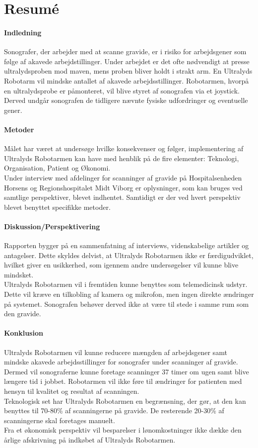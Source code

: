 \chapter{Resumé}
\subsubsection{Indledning}  
Sonografer, der arbejder med at scanne gravide, er i risiko for arbejdsgener som følge af akavede arbejdstillinger. Under arbejdet er det ofte nødvendigt at presse ultralydsproben mod maven, mens proben bliver holdt i strakt arm. En Ultralyds Robotarm vil mindske antallet af akavede arbejdsstillinger. Robotarmen, hvorpå en ultralydsprobe er påmonteret, vil blive styret af sonografen via et joystick. Derved undgår sonografen de tidligere nævnte fysiske udfordringer og eventuelle gener. 

\subsubsection{Metoder} 
Målet har været at undersøge hvilke konsekvenser og følger, implementering af Ultralyds Robotarmen kan  have med henblik på de fire elementer: Teknologi, Organisation, Patient og Økonomi. \\
Under interview med afdelinger for scanninger af gravide på Hospitalsenheden Horsens og Regionshospitalet Midt Viborg er oplysninger, som kan bruges ved samtlige perspektiver, blevet indhentet. Samtidigt er der ved hvert perspektiv blevet benyttet specifikke metoder. 

\subsubsection{Diskussion/Perspektivering} 
Rapporten bygger på en sammenfatning af interviews, videnskabelige artikler og antagelser. Dette skyldes delvist, at Ultralyds Robotarmen ikke er færdigudviklet, hvilket giver en usikkerhed, som igennem andre undersøgelser vil kunne blive mindsket. \\
Ultralyds Robotarmen vil  i fremtiden kunne benyttes som telemedicinsk udstyr. Dette vil kræve en tilkobling af kamera og mikrofon, men ingen direkte ændringer på systemet. Sonografen behøver derved ikke at være til stede i samme rum som den gravide.   

\subsubsection{Konklusion}
Ultralyds Robotarmen vil kunne reducere mængden af arbejdsgener samt mindske akavede arbejdsstillinger for sonografer under scanninger af gravide. Dermed vil sonograferne kunne foretage scanninger 37 timer om ugen samt blive længere tid i jobbet. Robotarmen vil ikke føre til ændringer for patienten med hensyn til kvalitet og resultat af scanningen. \\
Teknologisk set har Ultralyds Robotarmen en begrænsning, der gør, at den kan benyttes til 70-80\% af scanningerne på gravide. De resterende 20-30\% af scanningerne skal foretages manuelt.\\
Fra et økonomisk perspektiv vil besparelser i lønomkostninger ikke dække den årlige afskrivning på indkøbet af Ultralyds Robotarmen.